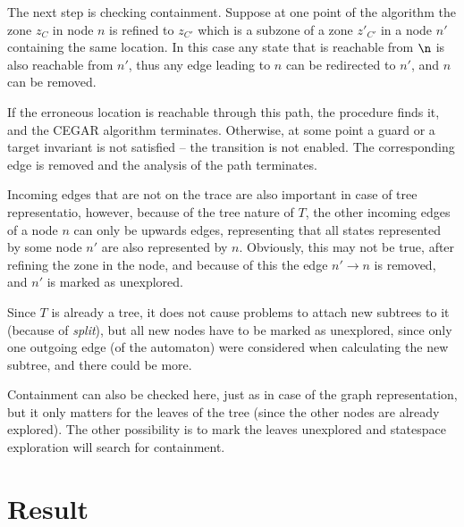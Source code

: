 The next step is checking containment. Suppose at one point of the
algorithm the zone $z_{C}$ in node $n$ %
 is 
refined to  $z_{C'}$ which is a
subzone of a zone $z'_{C'}$ in a node $n'$ containing the same location. In this case any state that is reachable from $\n$ is also reachable from $n'$, thus any edge leading to  $n$ can be redirected to $n'$, and $n$ can be removed.

If the erroneous location is reachable through this path, the procedure finds it,
and the CEGAR algorithm terminates. Otherwise, at some point a guard or a target invariant
is not satisfied -- the transition is not enabled. The corresponding edge is removed and the analysis of the path terminates.


Incoming edges that are not on the trace are also important in case of tree representatio, however, because of the tree nature of $T$, the other incoming edges of a node $n$ can only be upwards edges, representing that all states represented by some node $n'$ are also represented by $n$. Obviously, this may not be true, after refining the zone in the node, and because of this the edge $n' \to n$ is removed, and $n'$ is marked as unexplored.

Since $T$ is already a tree, it does not cause problems to attach new subtrees to it (because of \emph{split}), but all new nodes have to be marked as unexplored, since only one outgoing edge (of the automaton) were considered when calculating the new subtree, and there could be more.

Containment can also be checked here, just as in case of the graph representation, but it only matters for the leaves of the tree (since the other nodes are already explored). The other possibility is to mark the leaves unexplored and statespace exploration will search for containment.

   






\section{Result}


